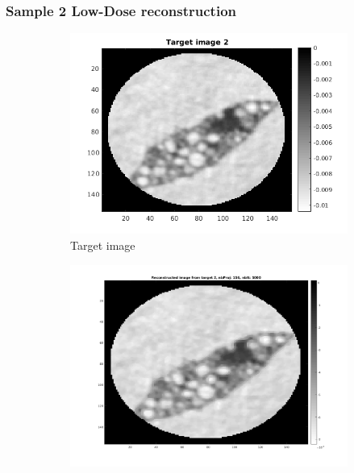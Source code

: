 \documentclass[10pt,a4paper,titlepage]{article}
\begin{document}
		\subsubsection{Sample 2 Low-Dose reconstruction}
		\begin{figure}[H]
		
       		\centering
      		\begin{subfigure}[b]{0.32\textwidth}
            	\centering
            	\includegraphics[width=\textwidth]{Sample2/target2.png}
            	\caption{Target image}    
        	\end{subfigure}
        	\begin{subfigure}[b]{0.32\textwidth}  
            	\centering 
            	\includegraphics[width=\textwidth]{Sample2/L-D_5000/156p.png}

\end{subfigure}
\end{figure}
\end{document}
